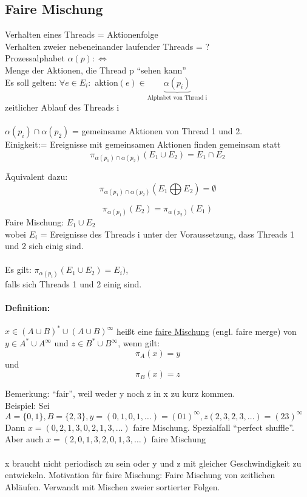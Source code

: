 \documentclass[a4paper,12pt]{scrartcl}
\begin{document}
 \subsection{Faire Mischung}
 
 Verhalten eines Threads = Aktionenfolge\\
 Verhalten zweier nebeneinander laufender Threads = ?\\
 Prozessalphabet $\alpha(p) :\Leftrightarrow$\\
 Menge der Aktionen, die Thread p "`sehen kann"'\\
 Es soll gelten: $\forall e \in E_i:$ aktion$(e) \in \underbrace{\alpha(p_i)}_{\text{Alphabet von Thread i}}$\\
 zeitlicher Ablauf des Threads i\\
 \\
 $\alpha(p_i)\cap\alpha(p_2)$ = gemeinsame Aktionen von Thread 1 und 2.\\
 Einigkeit:= Ereignisse mit gemeinsamen Aktionen finden gemeinsam statt
 $$\pi_{\alpha(p_1)\cap\alpha(p_2)}(E_1\cup E_2) = E_1\cap E_2$$
 
Äquivalent dazu:
$$\pi_{\alpha(p_1)\cap\alpha(p_2)}(E_1\bigoplus E_2) = \emptyset$$

$$\pi_{\alpha(p_1)}(E_2) =\pi_{\alpha(p_2)}(E_1)$$
Faire Mischung: $E_1\cup E_2$\\
wobei $E_i$ = Ereignisse des Threads i unter der Voraussetzung, dass Threads 1 und 2 sich einig sind.\\
\\
Es gilt: $\pi_{\alpha(p_i)}(E_1\cup E_2) = E_i)$,\\
falls sich Threads 1 und 2 einig sind.
 
 \paragraph{Definition:} $x\in (A\cup B)^* \cup (A\cup B)^\infty$ heißt eine \underline{faire Mischung} (engl. faire merge) von $y\in A^*\cup A^\infty$ und $z\in B^* \cup B^\infty$, wenn gilt:
 $$\pi_A(x)=y$$ und $$\pi_B(x)=z$$

 Bemerkung: "`fair"', weil weder y noch z in x zu kurz kommen.\\
 Beispiel: Sei $A=\{0,1\}, B=\{2,3\}, y=(0,1,0,1,\dots) = (01)^\infty, z(2,3,2,3,\dots)=(23)^\infty$\\
 Dann $x=(0,2,1,3,0,2,1,3,\dots)$ faire Mischung. Spezialfall "`perfect shuffle"'.\\
 Aber auch $x=(2,0,1,3,2,0,1,3,\dots)$ faire Mischung\\
 \\
 x braucht nicht periodisch zu sein oder y und z mit gleicher Geschwindigkeit zu entwickeln. Motivation für faire Mischung: Faire Mischung von zeitlichen Abläufen. Verwandt mit Mischen zweier sortierter Folgen.
 
\end{document}
